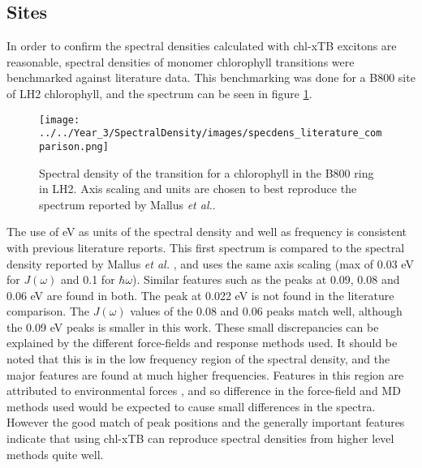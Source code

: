 \subsection{Sites}
\label{subsec:sites}

In order to confirm the spectral densities calculated with chl-xTB excitons are 
reasonable, spectral densities of monomer chlorophyll \Qy transitions were benchmarked 
against literature data. This benchmarking was done for a B800 site of LH2 chlorophyll,
and the spectrum can be seen in figure \ref{fig:specdens_lit}.

\begin{figure}
    \centering
    \texttt{[image: ../../Year\_3/SpectralDensity/images/specdens\_literature\_comparison.png]}
    \caption{Spectral density of the \Qy transition for a chlorophyll in the B800
    ring in LH2. Axis scaling and units are chosen to best reproduce the spectrum
    reported by Mallus \emph{et al.}\cite{Mallus2018}.}
    \label{fig:specdens_lit}
\end{figure}

The use of eV as units of the spectral density and well as frequency is consistent 
with previous literature reports. This first spectrum is compared to the spectral 
density reported by Mallus  \emph{et al.} \cite{Mallus2018}, and uses the same axis 
scaling (max of 0.03 eV for $J\left(\omega\right)$ and 0.1 for $\hbar \omega$). 
Similar features such as the peaks at 0.09, 0.08 and 0.06 eV are found in both. 
The peak at 0.022 eV is not found in the literature comparison. The $J\left(\omega\right)$ 
values of the 0.08 and 0.06 peaks match well, although the 0.09 eV peaks is smaller
in this work.
These small discrepancies can be explained by the different force-fields and response
methods used. It should be noted that this is in the low frequency region of the
spectral density, and the major features are found at much higher frequencies. Features
in this region are attributed to environmental forces \cite{Mallus2018}, and so 
difference in the force-field and MD methods used would be expected to cause small
differences in the spectra. However the good match of peak positions and the generally
important features indicate that using chl-xTB can reproduce spectral densities
from higher level methods quite well.

